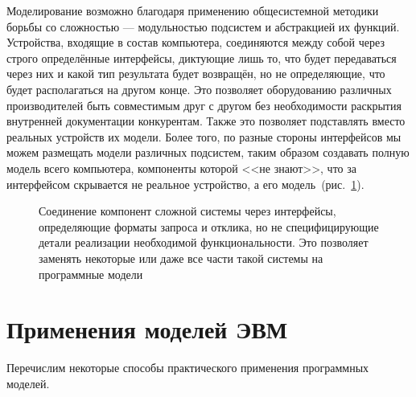 \begin{digression}
Моделирование возможно благодаря применению общесистемной методики борьбы со сложностью --- модульностью подсистем и абстракцией их функций. Устройства, входящие в состав компьютера, соединяются между собой через строго определённые интерфейсы, диктующие лишь то, что будет передаваться через них и какой тип результата будет возвращён, но не определяющие, что будет располагаться на другом конце. Это позволяет оборудованию различных производителей быть совместимым друг с другом без необходимости раскрытия внутренней документации конкурентам. Также это позволяет подставлять вместо реальных устройств их модели. Более того, по разные стороны интерфейсов мы можем размещать модели различных подсистем, таким образом создавать полную модель всего компьютера, компоненты которой <<не знают>>, что за интерфейсом скрывается не реальное устройство, а его модель~(рис.~\ref{fig:interface}).

\end{digression}

\begin{figure}[htp]
\centering
{}
\caption[Соединение компонент сложной системы через интерфейсы]{Соединение компонент сложной системы через интерфейсы, определяющие форматы запроса и отклика, но не специфицирующие детали реализации необходимой функциональности. Это позволяет заменять некоторые или даже все части такой системы на программные модели}\label{fig:interface}
\end{figure}

\section{Применения моделей ЭВМ}

Перечислим некоторые способы практического применения программных моделей.

